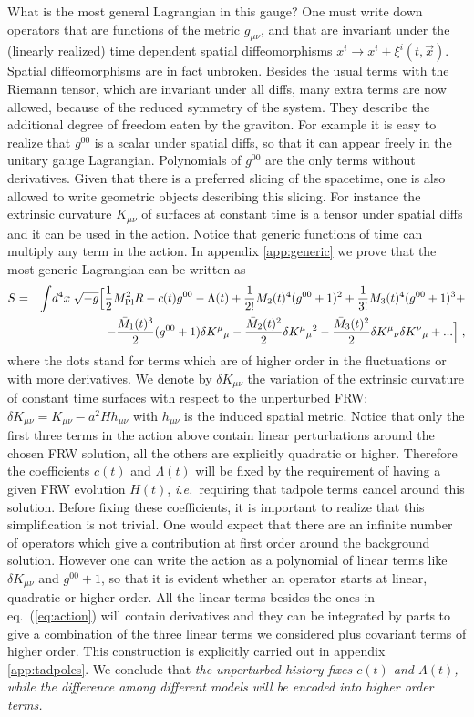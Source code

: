 \documentclass[12pt,letterpaper]{article}
\begin{document}
{What is the most general Lagrangian in this gauge? One must write down
operators that are functions of the metric $g_{\mu\nu}$, and that are invariant
under the (linearly realized) time dependent spatial diffeomorphisms $x^i\rightarrow
x^i+\xi^i(t,\vec{x})$. Spatial diffeomorphisms are in fact
unbroken. Besides the usual terms with the Riemann tensor, which are
invariant under all diffs, many extra terms are now allowed, because
of the reduced symmetry of the system. They describe the additional
degree of freedom eaten by the graviton. For example it is easy to
realize that $g^{00}$ is a scalar under spatial diffs, so that it can
appear freely in the unitary gauge Lagrangian. Polynomials of $g^{00}$
are the only terms without derivatives.  Given that there is a preferred slicing of the spacetime, one is also allowed to write geometric objects describing this slicing. For instance the extrinsic curvature $K_{\mu\nu}$ of surfaces at constant time is a tensor under spatial diffs and it can be used in the action.   Notice that generic functions of time can multiply any term in the action.
In appendix \ref{app:generic} we prove that the most generic Lagrangian can be written as
\begin{eqnarray}
\label{eq:action}\nonumber
S & = & \int  \! d^4 x \; \sqrt{- g} \Big[ \frac12 M_{\rm Pl}^2 R - c(t)
g^{00} -  \Lambda(t) + \frac{1}{2!}M_2(t)^4(g^{00}+1)^2+\frac{1}{3!}M_3(t)^4 (g^{00}+1)^3+ \\
&& - \frac{\bar M_1(t)^3}{2} (g^{00}+1)\delta K^\mu {}_\mu
-\frac{\bar M_2(t)^2}{2} \delta K^\mu {}_\mu {}^2
-\frac{\bar M_3(t)^2}{2} \delta K^\mu {}_\nu \delta K^\nu {}_\mu + ...
\Big] \; ,
\end{eqnarray}
where the dots stand for terms which are of higher order in the fluctuations or with more derivatives.
We denote by $\delta K_{\mu\nu}$ the variation of the extrinsic
curvature of constant time surfaces with respect to the unperturbed
FRW: $\delta K_{\mu\nu} = K_{\mu\nu} - a^2 H h_{\mu\nu}$ with
$h_{\mu\nu}$ is the induced spatial metric. Notice that only the first
three terms in the action above contain linear perturbations around
the chosen FRW solution, all the others are explicitly quadratic or
higher. Therefore the coefficients $c(t)$ and $\Lambda(t)$ will be fixed
by the requirement of having a given FRW evolution $H(t)$, {\em i.e.~}requiring that tadpole terms cancel around this solution. Before fixing these coefficients, it is important to realize that this simplification is not trivial. One would expect that there are an infinite number of operators which give a contribution at first order around the background solution. However one can write the action as a polynomial of linear terms like $\delta K_{\mu\nu}$ and $g^{00}+1$, so that it is evident whether an operator starts at linear, quadratic or higher order. All the linear terms besides the ones in eq.~(\ref{eq:action}) will contain derivatives and they can be integrated by parts to give a combination of the three linear terms we considered plus covariant terms of higher order. This construction is explicitly carried out in appendix \ref{app:tadpoles}.   We conclude that {\em the unperturbed history fixes $c(t)$ and $\Lambda(t)$, while the difference among different models will be encoded into higher order terms.}

}
\end{document}
